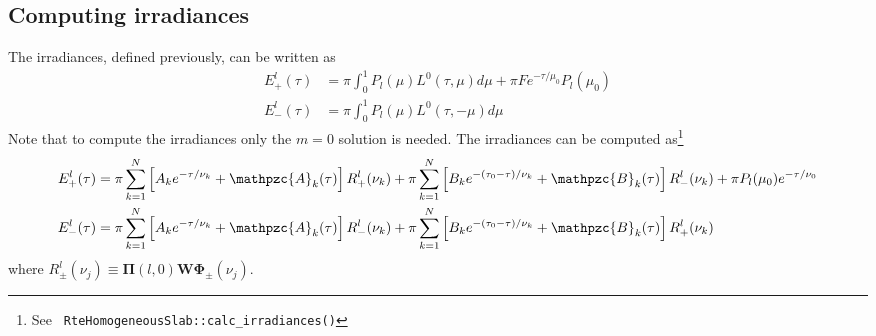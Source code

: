 \documentclass[11pt]{article}
\newcommand{\mvec}[1]{\mathbf{#1}}
\newcommand{\gvec}[1]{\boldsymbol{#1}}
\newcommand{\script}[1]{\mathpzc{#1}}
\begin{document}
\subsection{Computing irradiances}
The irradiances, defined previously, can be written as
\begin{align}
  E_+^l(\tau) &= \pi \int_0^1
  P_l(\mu) L^0(\tau,\mu) d\mu
  + \pi F e^{-\tau/\mu_0} P_l(\mu_0) \\
  E_-^l(\tau) &= \pi \int_0^1
  P_l(\mu) L^0(\tau,-\mu) d\mu
\end{align}
Note that to compute the irradiances only the $m=0$ solution is
needed. The irradiances can be computed as\footnote{See {\tt
    RteHomogeneousSlab::calc\_irradiances()}}
\begin{align}
  E_+^l(\tau) &= \pi \sum_{k=1}^N
  \left[
    A_k e^{-\tau/\nu_k} + \script{A}_k(\tau)
  \right] R_+^l(\nu_k)
  + \pi \sum_{k=1}^N
  \left[
    B_k e^{-(\tau_0-\tau)/\nu_k} + \script{B}_k(\tau)
  \right] R_-^l(\nu_k)
  + \pi P_l(\mu_0) e^{-\tau/\nu_0} \\
  E_-^l(\tau) &= \pi \sum_{k=1}^N
  \left[
    A_k e^{-\tau/\nu_k} + \script{A}_k(\tau)
  \right] R_-^l(\nu_k)
  + \pi \sum_{k=1}^N
  \left[
    B_k e^{-(\tau_0-\tau)/\nu_k} + \script{B}_k(\tau)
  \right] R_+^l(\nu_k)
\end{align}
where $R_\pm^l(\nu_j) \equiv \mvec{\Pi}(l,0) \mvec{W}
\gvec{\Phi}_\pm(\nu_j)$.
\end{document}
